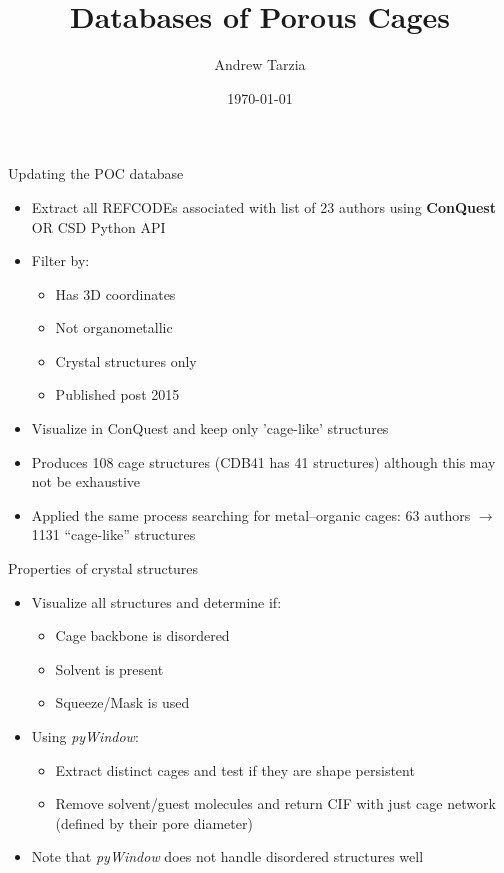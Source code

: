 \documentclass[handout]{beamer}
\institute{\texttt{[image: /home/atarzia/presentations/imperial\_beamer\_template/Imperial\_1\_Pantone\_solid.eps]}}
\title{Databases of Porous Cages}
\author{Andrew Tarzia}
\date{\today}
\begin{document}
 
\frame{\titlepage}


\begin{frame}{Updating the POC database}
\begin{itemize}
	\item Extract all REFCODEs associated with list of 23 authors using \textbf{ConQuest} OR CSD Python API
	\item Filter by:
	\begin{itemize}
		\item Has 3D coordinates
		\item Not organometallic
		\item Crystal structures only
		\item Published post 2015		
	\end{itemize}
	\item Visualize in ConQuest and keep only 'cage-like' structures
	\item Produces 108 cage structures (CDB41 has 41 structures) although this may not be exhaustive
	\item Applied the same process searching for metal--organic cages: 63 authors $\rightarrow$ 1131 ``cage-like'' structures
\end{itemize}
\end{frame}

\begin{frame}{Properties of crystal structures}
\begin{itemize}
	\item Visualize all structures and determine if:
	\begin{itemize}
		\item Cage backbone is disordered
		\item Solvent is present
		\item Squeeze/Mask is used		
	\end{itemize}
	\item Using \textit{pyWindow}:
	\begin{itemize}
		\item Extract distinct cages and test if they are shape persistent
		\item Remove solvent/guest molecules and return CIF with just cage network (defined by their pore diameter)
	\end{itemize}
	\item Note that \textit{pyWindow} does not handle disordered structures well
\end{itemize}
\end{frame}
\end{document}

